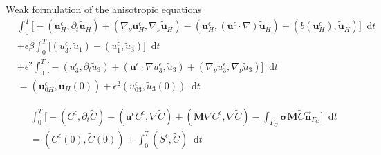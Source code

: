 \documentclass{beamer}
\newcommand*\diff{\mathop{}\!\mathrm{d}}
\begin{document}
\begin{frame}{Weak formulation of the anisotropic equations}
\changefontsizes{10pt}
  \begin{equation}
    \begin{split}
      & \int_0^T \bigg [ -(\mathbf{u}^\epsilon_H, \partial_t \mathbf{\tilde{u}}_H) + (\nabla_\nu \mathbf{u}^\epsilon_H, \nabla_\nu \mathbf{\tilde{u}}_H) - (\mathbf{u}^\epsilon_H, (\mathbf{u}^\epsilon \cdot \nabla) \mathbf{\tilde{u}}_H) + (b(\mathbf{u}^\epsilon_H), \mathbf{\tilde{u}}_H) \bigg ] \diff t \\
      & + \epsilon \beta \int_0 ^ T \big [ (u_3 ^\epsilon, \tilde{u}_1) - (u_1^\epsilon, \tilde{u}_3) \big ] \diff t\\
      & + \epsilon^2 \int _0 ^ T \big [ -(u_3^\epsilon, \partial_t \tilde{u}_3) +(\mathbf{u}^\epsilon \cdot \nabla u_3 ^ \epsilon, \tilde{u}_3) + (\nabla_\nu u_3^\epsilon, \nabla_\nu \tilde{u}_3) \big ] \diff t \\
      & = (\mathbf{u}^\epsilon_{0H}, \mathbf{\tilde{u}}_H(0)) + \epsilon^2 (u_{03}^\epsilon, \tilde{u}_3 (0)) \diff t
    \end{split}
  \end{equation}
  
    \begin{equation}
    \begin{split}
      & \int_0^T \bigg [ -(C^\epsilon, \partial_t \tilde{C}) -(\mathbf{u}^\epsilon C^\epsilon, \nabla \tilde{C}) + (\mathbf{M} \nabla C^\epsilon, \nabla \tilde{C}) - \int_{\Gamma_G} \boldsymbol{\sigma} \mathbf{M} \tilde{C} \vec{\boldsymbol{n}}_{\Gamma_G} \bigg ] \diff t \\
      & =  (C^\epsilon (0), \tilde{C} (0)) + \int_0^T (S^\epsilon,\tilde{C}) \diff t
    \end{split}
  \end{equation}

\end{frame}
\end{document}
